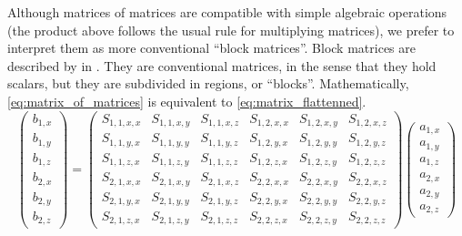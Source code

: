 Although matrices of matrices are compatible with simple algebraic operations (the product above follows the usual rule for multiplying matrices), we prefer to interpret them as more conventional ``block matrices''.
Block matrices are described by \citeauthor{eves2012elementary} in  \cite{eves2012elementary}.
They are conventional matrices, in the sense that they hold scalars, but they are subdivided in regions, or ``blocks''.
Mathematically, \cref{eq:matrix_of_matrices} is equivalent to \cref{eq:matrix_flattenned}.
\begin{equation}
    \begin{pmatrix}
        b_{1, x} \\ b_{1, y} \\ b_{1, z}
        \\
        b_{2, x} \\ b_{2, y} \\ b_{2, z}
    \end{pmatrix}
    =
    \begin{pmatrix}
        S_{1, 1, x, x} & S_{1, 1, x, y} & S_{1, 1, x, z}   &   S_{1, 2, x, x} & S_{1, 2, x, y} & S_{1, 2, x, z} \\
        S_{1, 1, y, x} & S_{1, 1, y, y} & S_{1, 1, y, z}   &   S_{1, 2, y, x} & S_{1, 2, y, y} & S_{1, 2, y, z} \\
        S_{1, 1, z, x} & S_{1, 1, z, y} & S_{1, 1, z, z}   &   S_{1, 2, z, x} & S_{1, 2, z, y} & S_{1, 2, z, z} \\
        S_{2, 1, x, x} & S_{2, 1, x, y} & S_{2, 1, x, z}   &   S_{2, 2, x, x} & S_{2, 2, x, y} & S_{2, 2, x, z} \\
        S_{2, 1, y, x} & S_{2, 1, y, y} & S_{2, 1, y, z}   &   S_{2, 2, y, x} & S_{2, 2, y, y} & S_{2, 2, y, z} \\
        S_{2, 1, z, x} & S_{2, 1, z, y} & S_{2, 1, z, z}   &   S_{2, 2, z, x} & S_{2, 2, z, y} & S_{2, 2, z, z}
    \end{pmatrix}
    \begin{pmatrix}
        a_{1, x} \\ a_{1, y} \\ a_{1, z}
        \\
        a_{2, x} \\ a_{2, y} \\ a_{2, z}
    \end{pmatrix}
    \label{eq:matrix_flattenned}
\end{equation}

